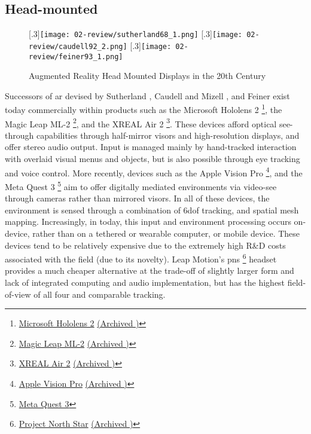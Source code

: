 \subsection{Head-mounted}\label{sec: ar-forms-hmd}
\begin{figure}
    \centering
    \captionsetup{justification=centering}
    [.3\linewidth]{\texttt{[image: 02-review/sutherland68\_1.png]}}
    \hfill
    [.3\linewidth]{\texttt{[image: 02-review/caudell92\_2.png]}}
    \hfill
    [.3\linewidth]{\texttt{[image: 02-review/feiner93\_1.png]}}%
    \caption{Augmented Reality Head Mounted Displays in the 20th Century}
    \label{fig: historicalHMDs}
\end{figure}
Successors of \gls{ar}  devised by Sutherland \citeyearpar{sutherland1968}, Caudell and Mizell \citeyearpar{caudell1992}, and Feiner \citeyearpar{feiner1993,feiner1997} exist today commercially within products such as the Microsoft Hololens 2 \footnote{\href{https://www.microsoft.com/en-us/hololens}{Microsoft Hololens 2} \href{https://archive.today/JM6pi}{(Archived \faArchive)}}, the Magic Leap ML-2 \footnote{\href{https://www.magicleap.com/magic-leap-2}{Magic Leap ML-2} \href{https://archive.today/EB2zn}{(Archived \faArchive)}}, and the XREAL Air 2 \footnote{\href{https://nreal.ai/product/}{XREAL Air 2} \href{https://archive.today/L45D4}{(Archived \faArchive)}}. These devices afford optical see-through capabilities through half-mirror visors and high-resolution displays, and offer stereo audio output. Input is managed mainly by hand-tracked interaction with overlaid visual menus and objects, but is also possible through eye tracking and voice control. More recently, devices such as the Apple Vision Pro \footnote{\href{https://www.apple.com/apple-vision-pro/}{Apple Vision Pro} \href{https://archive.today/TGrNh}{(Archived \faArchive)}}, and the Meta Quest 3 \footnote{\href{https://www.meta.com/gb/quest/quest-3//}{Meta Quest 3}} aim to offer digitally mediated environments via video-see through cameras rather than mirrored visors. In all of these devices, the environment is sensed through a combination of \gls{6dof} tracking, and spatial mesh mapping. Increasingly, in  today, this input and environment processing occurs on-device, rather than on a tethered or wearable computer, or mobile device. These devices tend to be relatively expensive due to the extremely high R\&D costs associated with the field (due to its novelty). Leap Motion's  \gls{pns} \footnote{\href{https://docs.projectnorthstar.org/}{Project North Star} \href{https://archive.today/ZNV3O}{(Archived \faArchive)}} headset provides a much cheaper alternative at the trade-off of slightly larger form and lack of integrated computing and audio implementation, but has the highest field-of-view of all four and comparable tracking.

